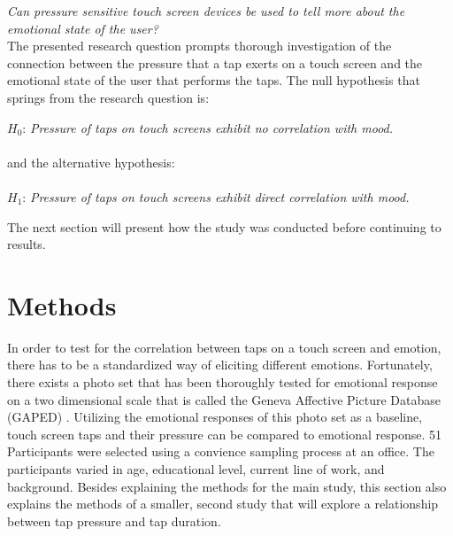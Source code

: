 \documentclass{sigchi}
\begin{document}
\textit{Can pressure sensitive touch screen devices be used to tell more about the emotional state of the user?}\\

The presented research question prompts thorough investigation of the connection between the pressure that a tap exerts on a touch screen and the emotional state of the user that performs the taps. The null hypothesis that springs from the research question is:

$H_0$: \textit{Pressure of taps on touch screens exhibit no correlation with mood.}
\\\\and the alternative hypothesis:\\\\
$H_1$: \textit{Pressure of taps on touch screens exhibit direct correlation with mood.}

The next section will present how the study was conducted before continuing to results.



\section{Methods} %
\label{sec:methods}
In order to test for the correlation between taps on a touch screen and emotion, there has to be a standardized way of eliciting different emotions. Fortunately, there exists a photo set that has been thoroughly tested for emotional response on a two dimensional scale that is called the Geneva Affective Picture Database (GAPED) \cite{Dan-glauser2011}. Utilizing the emotional responses of this photo set as a baseline, touch screen taps and their pressure can be compared to emotional response. 51 Participants were selected using a convience sampling process at an office. The participants varied in age, educational level, current line of work, and background. Besides explaining the methods for the main study, this section also explains the methods of a smaller, second study that will explore a relationship between tap pressure and tap duration.
\end{document}
